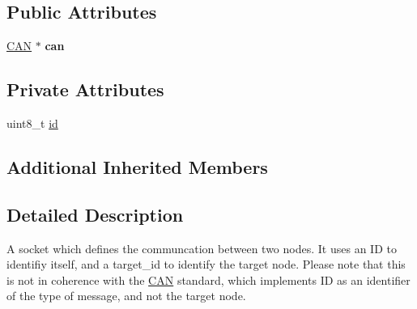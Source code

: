 \subsection*{Public Attributes}
\begin{DoxyCompactItemize}
\item 
\hypertarget{class_s_o_c_k_e_t_a40e1973f231f6e5c51f02bfb8e7c0722}{\hyperlink{class_c_a_n}{C\-A\-N} $\ast$ {\bfseries can}}\label{class_s_o_c_k_e_t_a40e1973f231f6e5c51f02bfb8e7c0722}

\end{DoxyCompactItemize}
\subsection*{Private Attributes}
\begin{DoxyCompactItemize}
\item 
uint8\-\_\-t \hyperlink{class_s_o_c_k_e_t_a0755fe74751c2d94d3d1679cad9e6544}{id}
\end{DoxyCompactItemize}
\subsection*{Additional Inherited Members}


\subsection{Detailed Description}
A socket which defines the communcation between two nodes. It uses an I\-D to identifiy itself, and a target\-\_\-id to identify the target node. Please note that this is not in coherence with the \hyperlink{class_c_a_n}{C\-A\-N} standard, which implements I\-D as an identifier of the type of message, and not the target node. 

